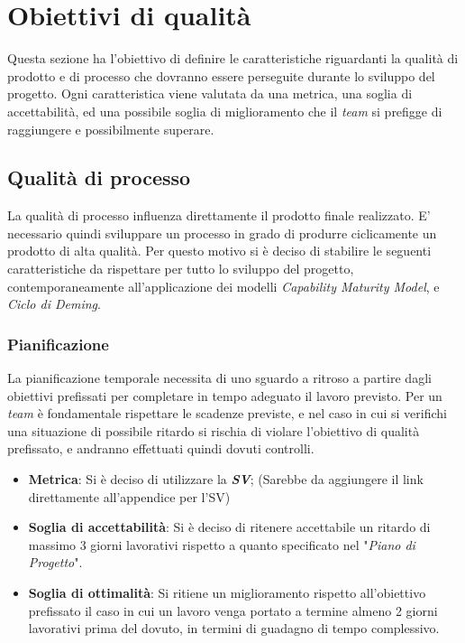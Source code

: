 \section{Obiettivi di qualità}
Questa sezione ha l'obiettivo di definire le caratteristiche riguardanti la qualità di prodotto e di processo che dovranno essere perseguite durante lo sviluppo del progetto.
Ogni caratteristica viene valutata da una metrica, una soglia di accettabilità, ed una possibile soglia di miglioramento che il \textit{team} si prefigge di raggiungere e possibilmente superare.
\subsection{Qualità di processo}
La qualità di processo influenza direttamente il prodotto finale realizzato. E' necessario quindi sviluppare un processo in grado di produrre ciclicamente un prodotto di alta qualità. Per questo motivo si è deciso di stabilire le seguenti caratteristiche da rispettare per tutto lo sviluppo del progetto, contemporaneamente all'applicazione dei modelli \textit{Capability Maturity Model}, e \textit{Ciclo di Deming}.
\subsubsection{Pianificazione}
La pianificazione temporale necessita di uno sguardo a ritroso a partire dagli obiettivi prefissati per completare in tempo adeguato il lavoro previsto. Per un \textit{team} è fondamentale rispettare le scadenze previste, e nel caso in cui si verifichi una situazione di possibile ritardo si rischia di violare l'obiettivo di qualità prefissato, e andranno effettuati quindi dovuti controlli.
\begin{itemize}
	\item \textbf{Metrica}: Si è deciso di utilizzare la \textit{\textbf{SV}}; (Sarebbe da aggiungere il link direttamente all'appendice per l'SV)
	\item \textbf{Soglia di accettabilità}: Si è deciso di ritenere accettabile un ritardo di massimo 3 giorni lavorativi rispetto a quanto specificato nel "\textit{Piano di Progetto}".
	\item \textbf{Soglia di ottimalità}: Si ritiene un miglioramento rispetto all'obiettivo prefissato il caso in cui un lavoro venga portato a termine almeno 2 giorni lavorativi prima del dovuto, in termini di guadagno di tempo complessivo.
\end{itemize}
